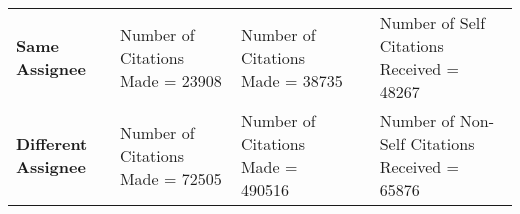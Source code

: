 \begin{table}[htbp]
\begin{tabular}{|p{8.085em}|p{8.335em}|p{8.665em}|l|l|}
\cmidrule{1-3}\cmidrule{5-5}    \rowcolor[rgb]{ .988,  .894,  .839} \textbf{Same Assignee} & \cellcolor[rgb]{ .867,  .922,  .969}Number of Citations Made = 23908 & \cellcolor[rgb]{ .867,  .922,  .969}Number of Citations Made = 38735 &       & \cellcolor[rgb]{ 1,  .949,  .8}Number of Self Citations Received = 48267 \\
\cmidrule{1-3}\cmidrule{5-5}    \rowcolor[rgb]{ .988,  .894,  .839} \textbf{Different Assignee} & \cellcolor[rgb]{ .867,  .922,  .969}Number of Citations Made = 72505 & \cellcolor[rgb]{ .867,  .922,  .969}Number of Citations Made = 490516 &       & \cellcolor[rgb]{ 1,  .949,  .8}Number of Non-Self Citations Received = 65876 \\
    \bottomrule
    \end{tabular}%
  \label{tab:addlabel}%
\end{table}%
